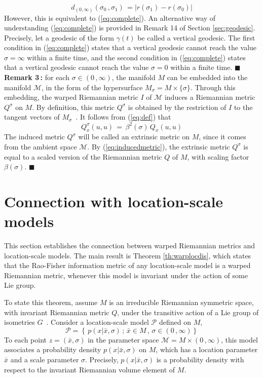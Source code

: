 \documentclass{svmult}
\begin{document}
$$
d_{(0,\infty)}(\sigma_{\scriptscriptstyle 0}\,,\sigma_{\scriptscriptstyle 1}) \,= \left| r(\sigma_{\scriptscriptstyle 1}) - r(\sigma_{\scriptscriptstyle 0})\right|
$$
However, this is equivalent to (\ref{eq:complete}). An alternative way of understanding (\ref{eq:complete}) is provided in Remark 14 of Section \ref{sec:geodesic}. Precisely, let a geodesic of the form $\gamma(t)$ be called a vertical geodesic. The first condition in (\ref{eq:complete}) states that a vertical geodesic cannot reach the value $\sigma = \infty$ within a finite time, and the second condition in (\ref{eq:complete}) states that a vertical geodesic cannot reach the value $\sigma = 0$ within a finite time. \hfill$\blacksquare$ \\[0.1cm] 
\textbf{Remark 3\,:} for each $\sigma \in (0\,,\infty)$, the manifold $M$ can be embedded into the manifold $\mathcal{M}$, in the form of the hypersurface $M_\sigma = M \times \lbrace \sigma \rbrace$. Through this embedding, the warped Riemannian metric $I$ of $\mathcal{M}$ induces a Riemannian metric $Q^\sigma$ on $M$. By definition, this metric $Q^\sigma$ is obtained by the restriction of $I$ to the tangent vectors of $M_\sigma$\!~\cite{petersen}\cite{docarmo}. It follows from (\ref{eq:def}) that
\begin{equation} \label{eq:inducedmetric}
  Q^\sigma_x(u,u) \,=\, \beta^2(\sigma)\,Q_x(u,u)  
\end{equation}
The induced metric $Q^\sigma$ will be called an extrinsic metric on $M$, since it comes from the ambient space $\mathcal{M}$. By (\ref{eq:inducedmetric}),
the extrinsic metric $Q^\sigma$ is equal to a scaled version of the Riemannian metric $Q$ of $M$, with scaling factor $\beta(\sigma)$. \hfill$\blacksquare$
\section{Connection with location-scale models} \label{sec:theorem}
 This section establishes the connection between warped Riemannian metrics and location-scale models. The main result is Theorem \ref{th:warplocdis}, which states that the Rao-Fisher information metric of any location-scale model is a warped Riemannian metric, whenever this model is invariant under the action of some Lie group.

To state this theorem, assume $M$ is an irreducible Riemannian symmetric space, with invariant Riemannian metric $Q$, under the transitive action of a Lie group of isometries $G$~\cite{helgason}. Consider a location-scale model $\mathcal{P}$ defined on $M$,
\begin{equation} \label{eq:locationscale}
  \mathcal{P} = \left\lbrace\,p(x|\bar{x},\sigma)\,;\,\bar{x} \in M \,,\, \sigma \in (0\,,\infty)\right\rbrace
\end{equation}
To each point $z = (\bar{x},\sigma)$ in the parameter space $\mathcal{M} = M \times (0\,,\infty)$, this model associates a probability density $p(x|\bar{x},\sigma)$ on $M$, which has a location parameter $\bar{x}$ and a scale parameter $\sigma$. Precisely, $p(x|\bar{x},\sigma)$ is a probability density with respect to the invariant Riemannian volume element of $M$. 
\end{document}
